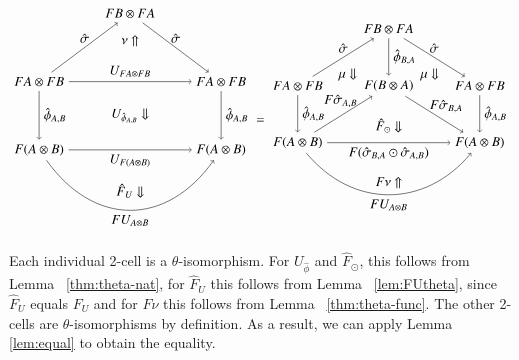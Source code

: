 \documentclass{amsart}
\begin{document}
\begin{equation}
\begin{aligned}
\begin{tikzpicture}[xscale=1.2, yscale=1.8]
\node (t) at (2,3) {$FB \otimes FA$};
\node (tl) at (0,2) {$FA \otimes FB$};
\node (bl) at (0,1) {$F(A\otimes B)$};
\node (tr) at (4,2) {$FA \otimes FB$};
\node (br) at (4,1) {$F(A\otimes B)$};
\draw[->] (t) to node [above] {$\hat{\sigma}$} (tr);
\draw[->] (tr) to node [right] {$\hat{\phi}_{A,B}$} (br);
\draw[->] (tl) to node [above] {$\hat{\sigma}$} (t);
\draw[->] (tl) to node [right] {$\hat{\phi}_{A,B}$} (bl);
\draw[->] (tl) to node [above] {$U_{FA \otimes FB}$} (tr);
\draw[->] (bl) to[in=-135, out=-45] node [below] {$FU_{A\otimes B}$} (br);
\draw[->] (bl) to node [below] {$U_{F(A \otimes B)}$} (br);
\node at (2,2.6) {$\nu \Uparrow$};
\node at (2,1.5) {$U_{\hat{\phi}_{A,B}} \Downarrow$};
\node at (2, 0.4) {$\hat{F}_U \Downarrow$};
\end{tikzpicture}
\end{aligned}
=
\begin{aligned}
\begin{tikzpicture}[xscale=1.2, yscale=1.5]
\node (t) at (2,3) {$FB \otimes FA$};
\node (tl) at (0,2) {$FA \otimes FB$};
\node (bl) at (0,1) {$F(A\otimes B)$};
\node (m) at (2,2) {$F(B\otimes A)$};
\node (tr) at (4,2) {$FA \otimes FB$};
\node (br) at (4,1) {$F(A\otimes B)$};
\draw[->] (t) to node [above] {$\hat{\sigma}$} (tr);
\draw[->] (t) to node [right] {$\hat{\phi}_{B,A}$} (m);
\draw[->] (tr) to node [right] {$\hat{\phi}_{A,B}$} (br);
\draw[->] (tl) to node [above] {$\hat{\sigma}$} (t);
\draw[->] (tl) to node [right] {$\hat{\phi}_{A,B}$} (bl);
\draw[->] (bl) to node [left,yshift=10pt, xshift=14pt] {$F\hat{\sigma}_{A,B}$} (m);
\draw[->] (m) to node [right,xshift=-7,yshift=6] {$F{\hat{\sigma}}_{B,A}$} (br);
\draw[->] (bl) to[in=-135, out=-45] node [below] {$FU_{A\otimes B}$} (br);
\draw[->] (bl) to node [below] {$F({\hat{\sigma}}_{B,A} \odot {\hat{\sigma}}_{A, B})$} (br);
\node at (1.1,2.2) {$\mu \Downarrow$};
\node at (2.9,2.2) {$\mu \Downarrow$};
\node at (2,1.3) {$ \hat{F}_{\odot} \Downarrow$};
\node at (2, 0.3) {$F\nu \Uparrow$};
\end{tikzpicture}
\end{aligned}
\end{equation} 

Each individual 2-cell is a $\theta$-isomorphism. For $U_{\hat{\phi}}$ and $\hat{F}_{\odot}$, 
this follows from Lemma ~\ref{thm:theta-nat}, for $\hat{F}_{U}$ this follows from Lemma ~\ref{lem:FUtheta}, since $\hat{F}_{U}$ equals $F_U$ and for $F \nu$ this follows from Lemma ~\ref{thm:theta-func}. The other 2-cells are $\theta$-isomorphisms by definition.
As a result, we can apply Lemma \ref{lem:equal} to obtain the equality.  
\end{document}
